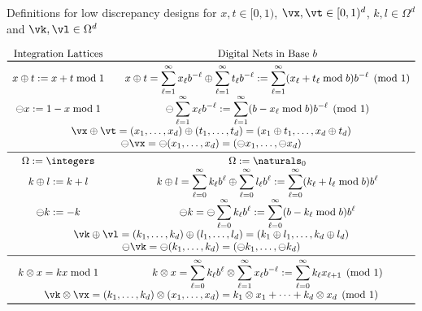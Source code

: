 \documentclass[graybox]{svmult}
\newcommand{\cube}{[0,1)^d}
\begin{document}
\begin{table}
\caption{Definitions for low discrepancy designs for $x,t \in [0,1)$, $\vx,\vt \in \cube$, $k, l \in \Omega^d$ and $\vk, \vl \in \Omega^d$ \label{discdestab}}
\renewcommand{\arraystretch}{1.5}
\[
\begin{array}{c@{\qquad}c}
\text{Integration Lattices} & \text{Digital Nets in Base } b\\
\toprule
x \oplus t := x + t \bmod 1  & \displaystyle x \oplus t =\sum_{\ell=1}^\infty x_{\ell}b^{-\ell} \oplus \sum_{\ell=1}^\infty t_{\ell}b^{-\ell} := \sum_{\ell=1}^\infty (x_{\ell} + t_{\ell} \bmod b) b^{-\ell} \pmod 1\\
\ominus x := 1-x \bmod 1  & \displaystyle \ominus \sum_{\ell=1}^\infty x_{\ell}b^{-\ell}  := \sum_{\ell=1}^\infty (b - x_{\ell} \bmod b) b^{-\ell} \pmod 1\\
\multicolumn{2}{c}{\vx \oplus \vt= (x_1, \ldots, x_d) \oplus (t_1, \ldots, t_d) = (x_1 \oplus t_1, \ldots, x_d \oplus t_d)} \\
\multicolumn{2}{c}{\ominus\vx = \ominus (x_1, \ldots, x_d) = (\ominus x_1, \ldots, \ominus x_d)} \\
\midrule
\Omega:=\integers  & \Omega := \naturals_0 \\
k \oplus l := k + l &  
\displaystyle k \oplus l =\sum_{\ell=0}^\infty k_{\ell}b^{\ell} \oplus \sum_{\ell=0}^\infty l_{\ell}b^{\ell} := \sum_{\ell=0}^\infty (k_{\ell} + l_{\ell} \bmod b) b^{\ell}\\
\ominus k := -k & 
\displaystyle \ominus k = \ominus \sum_{\ell=0}^\infty k_{\ell}b^{\ell} := \sum_{\ell=0}^\infty (b - k_{\ell} \bmod b) b^{\ell}\\
\multicolumn{2}{c}{\vk \oplus \vl= (k_1, \ldots, k_d) \oplus (l_1, \ldots, l_d) = (k_1 \oplus l_1, \ldots, k_d \oplus l_d)} \\
\multicolumn{2}{c}{\ominus\vk = \ominus (k_1, \ldots, k_d) = (\ominus k_1, \ldots, \ominus k_d)} \\
\midrule
k \otimes x = kx \bmod 1 & \displaystyle k \otimes x =\sum_{\ell=0}^\infty k_{\ell}b^{\ell} \otimes \sum_{\ell=1}^\infty x_{\ell}b^{-\ell} := \sum_{\ell=0}^\infty k_{\ell} x_{\ell+1} \pmod 1\\
\multicolumn{2}{c}{\vk \otimes \vx= (k_1, \ldots, k_d) \otimes (x_1, \ldots, x_d) = k_1 \otimes x_1 + \cdots + k_d \otimes x_d \pmod 1}\\
\bottomrule
\end{array}
\] 
\end{table}
\end{document}
